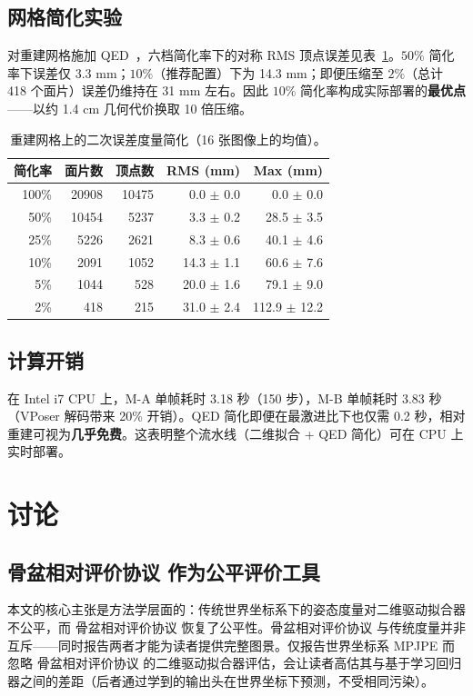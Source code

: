 \documentclass[a4paper,11pt]{article}
\newcommand{\prp}{骨盆相对评价协议}
\begin{document}
\subsection{网格简化实验}
对重建网格施加 QED~\cite{QED}，六档简化率下的对称 RMS 顶点误差见表~\ref{tab:qed}。$50\%$ 简化率下误差仅 3.3 mm；$10\%$（推荐配置）下为 14.3 mm；即便压缩至 $2\%$（总计 418 个面片）误差仍维持在 31 mm 左右。因此 $10\%$ 简化率构成实际部署的\textbf{最优点}——以约 1.4 cm 几何代价换取 10 倍压缩。

\begin{table}[htbp]
\centering
\caption{重建网格上的二次误差度量简化（16 张图像上的均值）。}
\label{tab:qed}
\begin{tabular}{r r r r r}
\toprule
简化率 & 面片数 & 顶点数 & RMS (mm) & Max (mm)\\
\midrule
100\% & 20908 & 10475 & 0.0 $\pm$ 0.0  & 0.0 $\pm$ 0.0 \\
50\%  & 10454 &  5237 & 3.3 $\pm$ 0.2  & 28.5 $\pm$ 3.5 \\
25\%  &  5226 &  2621 & 8.3 $\pm$ 0.6  & 40.1 $\pm$ 4.6 \\
10\%  &  2091 &  1052 & 14.3 $\pm$ 1.1 & 60.6 $\pm$ 7.6 \\
5\%   &  1044 &   528 & 20.0 $\pm$ 1.6 & 79.1 $\pm$ 9.0 \\
2\%   &   418 &   215 & 31.0 $\pm$ 2.4 & 112.9 $\pm$ 12.2 \\
\bottomrule
\end{tabular}
\end{table}

\subsection{计算开销}
在 Intel i7 CPU 上，M-A 单帧耗时 3.18 秒（150 步），M-B 单帧耗时 3.83 秒（VPoser 解码带来 20\% 开销）。QED 简化即便在最激进比下也仅需 0.2 秒，相对重建可视为\textbf{几乎免费}。这表明整个流水线（二维拟合 + QED 简化）可在 CPU 上实时部署。

\section{讨论}
\label{sec:discussion}

\subsection{\prp{} 作为公平评价工具}
本文的核心主张是方法学层面的：传统世界坐标系下的姿态度量对二维驱动拟合器不公平，而 \prp{} 恢复了公平性。\prp{} 与传统度量并非互斥——同时报告两者才能为读者提供完整图景。仅报告世界坐标系 MPJPE 而忽略 \prp{} 的二维驱动拟合器评估，会让读者高估其与基于学习回归器之间的差距（后者通过学到的输出头在世界坐标下预测，不受相同污染）。
\end{document}
